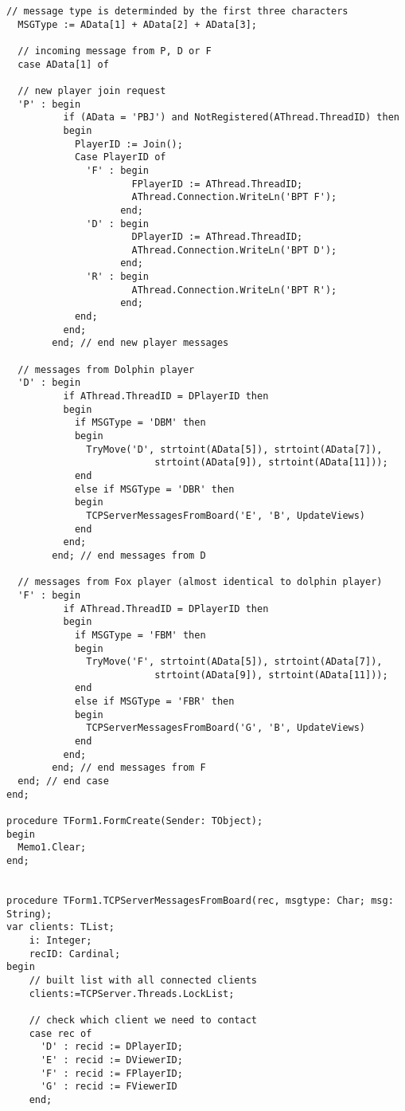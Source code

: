 \documentclass{article}
\begin{document}
\begin{lstlisting}[basicstyle=\footnotesize]
  // message type is determinded by the first three characters
  MSGType := AData[1] + AData[2] + AData[3];

  // incoming message from P, D or F
  case AData[1] of

  // new player join request
  'P' : begin
          if (AData = 'PBJ') and NotRegistered(AThread.ThreadID) then
          begin
            PlayerID := Join();
            Case PlayerID of
              'F' : begin
                      FPlayerID := AThread.ThreadID;
                      AThread.Connection.WriteLn('BPT F');
                    end;
              'D' : begin
                      DPlayerID := AThread.ThreadID;
                      AThread.Connection.WriteLn('BPT D');
                    end;
              'R' : begin
                      AThread.Connection.WriteLn('BPT R');
                    end;
            end;
          end;
        end; // end new player messages

  // messages from Dolphin player
  'D' : begin
          if AThread.ThreadID = DPlayerID then
          begin
            if MSGType = 'DBM' then
            begin
              TryMove('D', strtoint(AData[5]), strtoint(AData[7]),
                          strtoint(AData[9]), strtoint(AData[11]));
            end
            else if MSGType = 'DBR' then
            begin
              TCPServerMessagesFromBoard('E', 'B', UpdateViews)
            end
          end;
        end; // end messages from D

  // messages from Fox player (almost identical to dolphin player)
  'F' : begin
          if AThread.ThreadID = DPlayerID then
          begin
            if MSGType = 'FBM' then
            begin
              TryMove('F', strtoint(AData[5]), strtoint(AData[7]),
                          strtoint(AData[9]), strtoint(AData[11]));
            end
            else if MSGType = 'FBR' then
            begin
              TCPServerMessagesFromBoard('G', 'B', UpdateViews)
            end
          end;
        end; // end messages from F
  end; // end case
end;

procedure TForm1.FormCreate(Sender: TObject);
begin
  Memo1.Clear;
end;


procedure TForm1.TCPServerMessagesFromBoard(rec, msgtype: Char; msg: String);
var clients: TList;
    i: Integer;
    recID: Cardinal;
begin
    // built list with all connected clients
    clients:=TCPServer.Threads.LockList;

    // check which client we need to contact
    case rec of
      'D' : recid := DPlayerID;
      'E' : recid := DViewerID;
      'F' : recid := FPlayerID;
      'G' : recid := FViewerID
    end;


\end{lstlisting}
\end{document}
